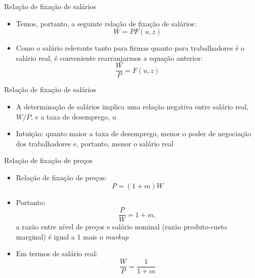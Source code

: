 \documentclass[10pt]{beamer}
\begin{document}
\begin{frame}
    {Relação de fixação de salários}
    \begin{itemize}
        \item Temos, portanto, a seguinte relação de fixação de salários:
        \begin{equation}
            W = PF(u,z)
        \end{equation}
        \item Como o salário relevante tanto para firmas quanto para trabalhadores é o salário real, é conveniente rearranjarmos a equação anterior:
        \begin{equation}
            \frac{W}{P} = F(u,z)
        \end{equation}
    \end{itemize}
\end{frame}

\begin{frame}
    {Relação de fixação de salários}
    \begin{itemize}
        \item A determinação de salários implica uma relação negativa entre salário real, $W/P$, e a taxa de desemprego, $u$\bigskip
        \item Intuição: quanto maior a taxa de desemprego, menor o poder de negociação dos trabalhadores e, portanto, menor o salário real
    \end{itemize}
\end{frame}

\begin{frame}
    {Relação de fixação de preços}
    \begin{itemize}
        \item Relação de fixação de preços:
        \begin{equation}
            P = (1 + m)W
        \end{equation}
        \item Portanto:
        \begin{equation}
            \frac{P}{W} = 1 + m,
        \end{equation}
        a razão entre nível de preços e salário nominal (razão produto-custo marginal) é igual a 1 mais o \emph{markup}\bigskip
        \item Em termos de salário real:
        \begin{equation}
            \frac{W}{P} = \frac{1}{1 + m}
        \end{equation}
    \end{itemize}
\end{frame}
\end{document}
